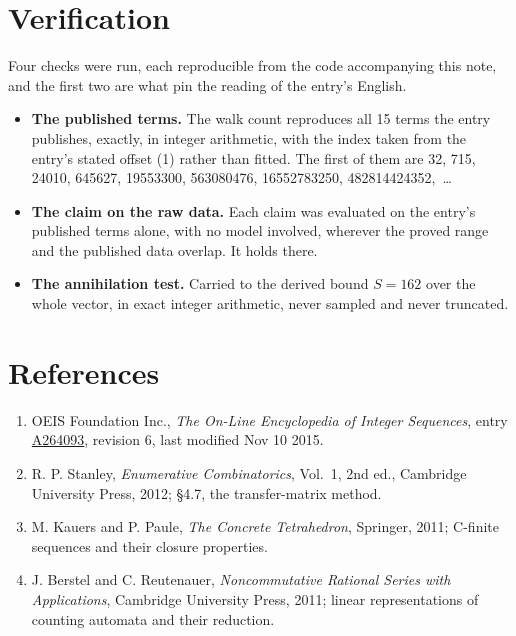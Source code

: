 \documentclass[11pt]{article}
\theoremstyle{definition}
\begin{document}
\section{Verification}

Four checks were run, each reproducible from the code accompanying this note, and the first two are what pin the reading of the entry's English.

\begin{itemize}

\item {\bfseries The published terms.} The walk count reproduces all 15 terms the entry publishes, exactly, in integer arithmetic, with the index taken from the entry's stated offset (1) rather than fitted. The first of them are 32, 715, 24010, 645627, 19553300, 563080476, 16552783250, 482814424352,~\dots

\item {\bfseries The claim on the raw data.} Each claim was evaluated on the entry's published terms alone, with no model involved, wherever the proved range and the published data overlap. It holds there.

\item {\bfseries The annihilation test.} Carried to the derived bound $S = 162$ over the whole vector, in exact integer arithmetic, never sampled and never truncated.

\end{itemize}

\section{References}

\begin{enumerate}

\item OEIS Foundation Inc., \emph{The On-Line Encyclopedia of Integer Sequences}, entry \href{https://oeis.org/A264093}{A264093}, revision 6, last modified Nov 10 2015.

\item R. P. Stanley, \emph{Enumerative Combinatorics}, Vol.~1, 2nd ed., Cambridge University Press, 2012; \S4.7, the transfer-matrix method.

\item M. Kauers and P. Paule, \emph{The Concrete Tetrahedron}, Springer, 2011; C-finite sequences and their closure properties.

\item J. Berstel and C. Reutenauer, \emph{Noncommutative Rational Series with Applications}, Cambridge University Press, 2011; linear representations of counting automata and their reduction.

\end{enumerate}
\end{document}
